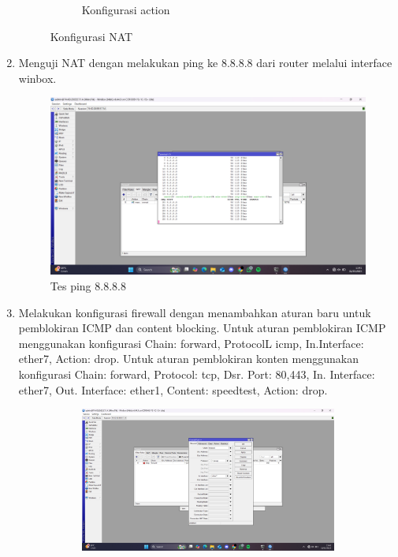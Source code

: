 \begin{enumerate}
\begin{figure}[H]
\begin{subfigure}[b]{0.4\linewidth}
			\caption{Konfigurasi action\label{fig:konfigurasiR2}}
		\end{subfigure}
		\caption{Konfigurasi NAT}
		\hspace{1cm}
	\end{figure}
	\item Menguji NAT dengan melakukan ping ke 8.8.8.8 dari router melalui interface winbox.
	\begin{figure}[H]
		\centering
		\includegraphics[width=\linewidth]{P4/img/ping 8888.png}
		\caption{Tes ping 8.8.8.8}
		\hspace{1cm}
	\end{figure}
	\item Melakukan konfigurasi firewall dengan menambahkan aturan baru untuk pemblokiran ICMP dan content blocking. Untuk aturan pemblokiran ICMP menggunakan konfigurasi Chain: forward, ProtocolL icmp, In.Interface: ether7, Action: drop. Untuk aturan pemblokiran konten menggunakan konfigurasi Chain: forward, Protocol: tcp, Dsr. Port: 80,443, In. Interface: ether7, Out. Interface: ether1, Content: speedtest, Action: drop.
	\begin{figure}[H]
		\centering
		\begin{subfigure}[b]{0.4\linewidth}
			\centering
			\includegraphics[width=\linewidth]{P4/img/firewall (2).png}

\end{subfigure}
\end{figure}
\end{enumerate}
